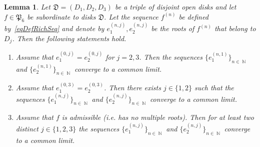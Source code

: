\documentclass{amsart}
\numberwithin{equation}{section}
\newtheorem{lemma}[theorem]{Lemma}
\theoremstyle{definition}
\theoremstyle{remark}
\DeclareMathOperator{\NN}{\mathbb N}
\begin{document}
	\begin{lemma}\label{lemPartialConvergence}
		Let $\mathfrak D = (D_1, D_2, D_3)$ be a triple of disjoint open disks and let $f \in \mathfrak P_6$ be subordinate to disks $\mathfrak D$. Let the sequence $f^{(n)}$ be defined by~\eqref{eqDefRichSeq} and denote by $e^{(n,j)}_{1}, e^{(n,j)}_{2}$ be the roots of $f^{(n)}$ that belong to $D_j$. Then the following statements hold.
		\begin{enumerate}[label=(\roman*)]
			\item\label{PartialConvergencei} Assume that $e^{(0,j)}_{1} = e^{(0,j)}_{2}$ for $j = 2,3$. Then the sequences $\{e^{(n,1)}_{1}\}_{n \in \NN}$ and $\{e^{(n,1)}_{2}\}_{n \in \NN}$ converge to a common limit.
			\item\label{PartialConvergenceii} Assume that $e^{(0,3)}_{1} = e^{(0,3)}_{2}$. Then there exists $j \in \{1,2\}$ such that the sequences $\{e^{(n,j)}_{1}\}_{n \in \NN}$ and $\{e^{(n,j)}_{2}\}_{n \in \NN}$ converge to a common limit.
			\item\label{PartialConvergenceiii} Assume that $f$ is admissible (i.e. has no multiple roots). Then for at least two distinct $j \in \{1,2,3\}$ the sequences $\{e^{(n,j)}_{1}\}_{n \in \NN}$ and $\{e^{(n,j)}_{2}\}_{n \in \NN}$ converge to a common limit.
		\end{enumerate}
	\end{lemma}
\end{document}
